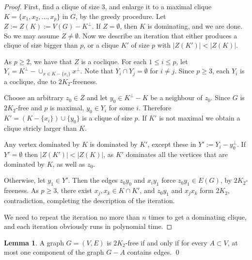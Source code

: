 \documentclass{amsart}
\theoremstyle{definition}
\newtheorem{lemma}{Lemma}
\begin{document}
\begin{proof}
First, find a clique of size 3,  and enlarge it to a maximal clique $K=\{x_1,x_2,\ldots,x_p\}$ in $G$, by 
the greedy procedure.
Let $Z:=Z(K):=V(G)-K^{\perp}$. 
If $Z=\emptyset$, then $K$ is dominating, and we are done. So we may assume $Z\neq\emptyset$.
Now we describe an iteration that either produces a clique of size bigger than $p$, or
a clique $K'$ of size $p$ with $|Z(K')|<|Z(K)|$.

As $p\ge2$, we have that $Z$ is a coclique. 
For each $1\leq i\leq p$, let 
$Y_i=K^\perp - \cup_{x\in K-\{x_i\}} x^\perp$.
Note that $Y_i\cap Y_j=\emptyset$ for $i\neq j$. 
Since $p\ge3$, each $Y_i$ is a coclique, due to $2K_2$-freeness.
 
Choose an arbitrary $z_0\in Z$ and let $y_0\in K^{\perp}-K$ be a neighbour of
$z_0$. Since $G$ is $2K_2$-free and $p$ is maximal, $y_0\in Y_i$ for
some $i$.  Therefore
$K'=(K-\{x_i\})\cup\{y_0\}$ is a clique of size $p$. 
If $K'$ is not maximal we obtain a clique stricly larger than $K$.

Any vertex dominated by $K$ is dominated by $K'$, except these in
$Y':= Y_i-y_0^\perp$. If $Y'=\emptyset$ then $|Z(K')|<|Z(K)|$, 
as $K'$ dominates all the vertices that are dominated by $K$, 
as well as $z_0$.

Otherwise, let $y_1\in Y'$. Then the edges $z_0y_0$ and $x_iy_1$ force $z_0y_1\in E(G)$, by $2K_2$-freeness. 
As $p\geq 3$, there exist $x_j, x_k\in K\cap K'$, and 
$z_0y_1$ and $x_jx_k$ form $2K_2$,  contradiction, completing the description of the iteration.

We need to repeat the iteration no more than $n$ times to get a dominating clique, and each iteration 
obviously runs in polynomial time.
\end{proof}


\begin{lemma}\label{lm3}{\cite[Observation 1]{broersma2014toughness}}
A graph $G=(V,E)$ is $2K_2$-free if and only if for every $A\subset V$, at most one component of the graph $G-A$ contains edges. \qed
\end{lemma}
\end{document}
